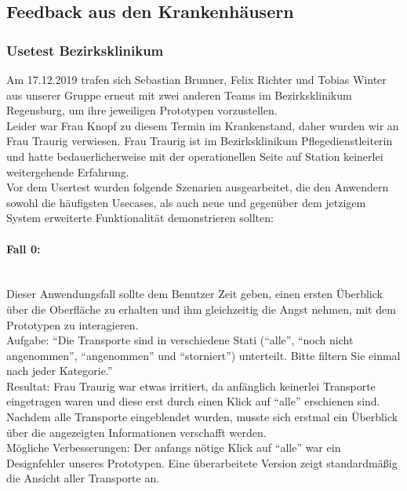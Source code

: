\documentclass[a4paper, ngerman, 12pt]{scrartcl}
\begin{document}
\subsection{Feedback aus den Krankenhäusern}
\subsubsection{Usetest Bezirksklinikum}
Am 17.12.2019 trafen sich Sebastian Brunner, Felix Richter und Tobias Winter aus unserer Gruppe erneut mit zwei anderen Teams im Bezirksklinikum Regensburg, um ihre jeweiligen Prototypen vorzustellen.\\

Leider war Frau Knopf zu diesem Termin im Krankenstand, daher wurden wir an Frau Traurig verwiesen. Frau Traurig ist im Bezirksklinikum Pflegedienstleiterin und hatte bedauerlicherweise mit der operationellen Seite auf Station keinerlei weitergehende Erfahrung.\\
 
Vor dem Usertest wurden folgende Szenarien ausgearbeitet, die den Anwendern sowohl die häufigsten Usecases, als auch neue und gegenüber dem jetzigem System erweiterte Funktionalität demonstrieren sollten:

\paragraph{Fall 0:}\leavevmode\\
Dieser Anwendungsfall sollte dem Benutzer Zeit geben, einen ersten Überblick über die Oberfläche zu erhalten und ihm gleichzeitig die Angst nehmen, mit dem Prototypen zu interagieren.\\
 
Aufgabe: “Die Transporte sind in verschiedene Stati (“alle”, “noch nicht angenommen”, “angenommen” und “storniert”) unterteilt. Bitte filtern Sie einmal nach jeder Kategorie.”\\
 
Resultat: Frau Traurig war etwas irritiert, da anfänglich keinerlei Transporte eingetragen waren und diese erst durch einen Klick auf “alle” erschienen sind. Nachdem alle Transporte eingeblendet wurden, musste sich erstmal ein Überblick über die angezeigten Informationen verschafft werden.\\
 
Mögliche Verbesserungen: Der anfangs nötige Klick auf “alle” war ein Designfehler unseres Prototypen. Eine überarbeitete Version zeigt standardmäßig die Ansicht aller Transporte an.
\end{document}

